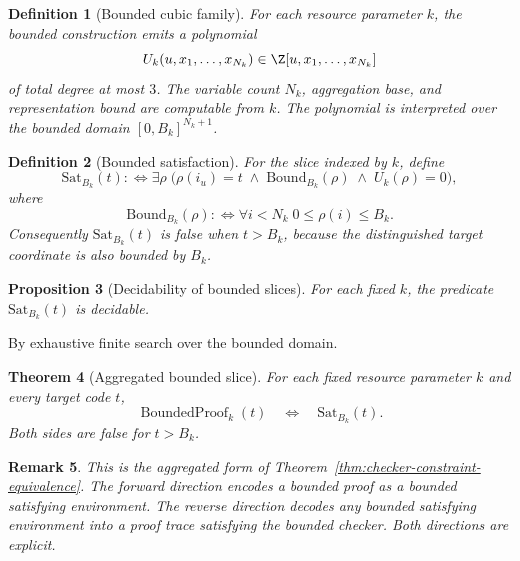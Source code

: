 \documentclass[letterpaper,10pt]{article}
\makeatletter
\theoremstyle{upright}
\theoremstyle{upright}
\newtheorem{theorem}{Theorem}[section]
\newtheorem{remark}[theorem]{Remark}
\newtheorem{definition}[theorem]{Definition}
\newtheorem{proposition}[theorem]{Proposition}
\renewenvironment{proof}[1][Proof]{%
	\par\pushQED{\qed}%
	\normalfont
	\topsep6\p@\@plus6\p@\relax
	\trivlist
	\item[\hskip\labelsep\slshape #1\@addpunct{.}]%
}{%
	\popQED\endtrivlist\@endpefalse
}
\makeatother
\begin{document}
\begin{definition}[Bounded cubic family]
\label{def:bounded-cubic-family}
	For each resource parameter $k$, the bounded construction emits a polynomial
	\begin{equation}
		U_k(u,x_1,\ldots,x_{N_k})\in\Z[u,x_1,\ldots,x_{N_k}]
	\end{equation}
	of total degree at most $3$. The variable count $N_k$, aggregation base, and representation bound are computable from $k$. The polynomial is interpreted over the bounded domain $[0,B_k]^{N_k+1}$.
\end{definition}

\begin{definition}[Bounded satisfaction]
\label{def:bounded-sat}
	For the slice indexed by $k$, define
	\begin{equation}
	\label{eq:sat-b}
		\mathrm{Sat}_{B_k}(t)
		:\iff
		\exists\rho\;\bigl(\rho(i_u)=t\;\wedge\;\mathrm{Bound}_{B_k}(\rho)\;\wedge\;U_k(\rho)=0\bigr),
	\end{equation}
	where
	\begin{equation}
		\mathrm{Bound}_{B_k}(\rho):\iff \forall i<N_k\;0\leq\rho(i)\leq B_k.
	\end{equation}
	Consequently $\mathrm{Sat}_{B_k}(t)$ is false when $t>B_k$, because the distinguished target coordinate is also bounded by $B_k$.
\end{definition}

\begin{proposition}[Decidability of bounded slices]
\label{prop:bounded-decidable}
	For each fixed $k$, the predicate $\mathrm{Sat}_{B_k}(t)$ is decidable.
\end{proposition}

\begin{proof}
	By exhaustive finite search over the bounded domain.
\end{proof}

\begin{theorem}[Aggregated bounded slice]
\label{thm:bounded-compilation}
	For each fixed resource parameter $k$ and every target code $t$,
	\begin{equation}
		\operatorname{BoundedProof}_k(t)
		\quad\Longleftrightarrow\quad
		\mathrm{Sat}_{B_k}(t).
	\end{equation}
	Both sides are false for $t>B_k$.
\end{theorem}

\begin{remark}
	This is the aggregated form of Theorem~\ref{thm:checker-constraint-equivalence}. The forward direction encodes a bounded proof as a bounded satisfying environment. The reverse direction decodes any bounded satisfying environment into a proof trace satisfying the bounded checker. Both directions are explicit.
\end{remark}
\end{document}

